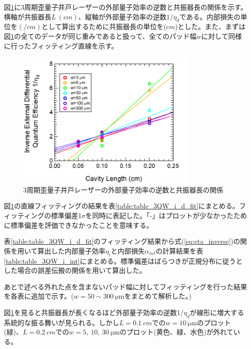 {図\ref{fig:fig_3_1_3QW_broadcontact_id_inverse_02}に3周期歪量子井戸レーザーの外部量子効率の逆数と共振器長の関係を示す。横軸が共振器長$L\ (\si{cm})$、縦軸が外部量子効率の逆数$1/\eta_{d}$である。内部損失の単位を$\si{(/cm)}$として算出するために共振器長の単位を($\si{cm}$)とした。また、まずは図\ref{fig:fig_3_1_3QW_broadcontact_id_inverse_02}の全てのデータが同じ重みであると扱って、全てのパッド幅$w$に対して同様に行ったフィッティング直線を示す。　



\begin{figure}[h]
	\centering
	\includegraphics[width=9cm]{figure/fig_3_1_3QW_broadcontact_id_inverse_02.png}
	\caption{3周期歪量子井戸レーザーの外部量子効率の逆数と共振器長の関係}
	\label{fig:fig_3_1_3QW_broadcontact_id_inverse_02}
\end{figure}
図\ref{fig:fig_3_1_3QW_broadcontact_id_inverse_02}の直線フィッティングの結果を表\ref{table:table_3QW_i_d_fit}にまとめる。フィッティングの標準偏差1$\sigma$を同時に表記した。「-」はプロットが少なかったために標準偏差を評価できなかったことを意味する。

表\ref{table:table_3QW_i_d_fit}のフィッティング結果から式(\ref{eq:eta_inverse})の関係を用いて算出した内部量子効率$\eta_{i}$と内部損失$\alpha_{int}$の計算結果を表\ref{table:table_3QW_i_int}にまとめる。標準偏差はばらつきが正規分布に従うとした場合の誤差伝搬の関係を用いて算出した。

あとで述べる外れた点を含まないパッド幅に対してフィッティングを行った結果を各表に追加で示す。($w=50\sim300\ \si{\micro\metre}$をまとめて解析した。)

図\ref{fig:fig_3_1_3QW_broadcontact_id_inverse_02}を見ると共振器長が長くなるほど外部量子効率の逆数1/$\eta_{d}$が線形に増大する系統的な振る舞いが見られる。しかし$L=0.1\ \si{cm}$での$w=10\ \si{\micro\metre}$のプロット(緑)、$L=0.2\ \si{cm}$での$w=5, \ 10,\  30\ \si{\micro\metre}$のプロット(黄色、緑、水色)が外れている。

}
